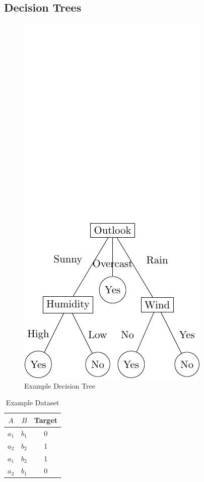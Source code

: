 \documentclass[letterpaper,12pt]{article}
\begin{document}
\subsection*{Decision Trees}
\begin{figure}[H]
    \caption{Example Decision Tree}
    \centering
    \includegraphics[scale=1]{images/dectree.pdf}
\end{figure}
\begin{table}[H]
    \centering
    \caption{Example Dataset}
    \vspace{5mm}
    \begin{tabular}{| c | c | c |}
        \hline
        $A$ & $B$ & Target \\
        \hline
        $a_1$ & $b_1$ & 0 \\
        $a_2$ & $b_2$ & 1 \\
        $a_1$ & $b_2$ & 1 \\
        $a_2$ & $b_1$ & 0  \\
        \hline
    \end{tabular}
\end{table}
\end{document}
